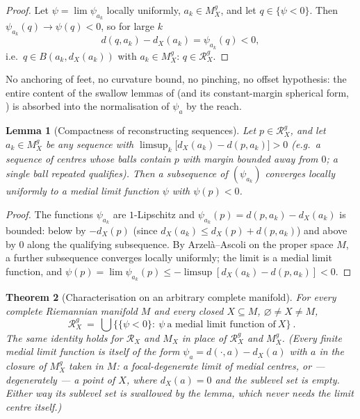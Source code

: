 \documentclass[11pt]{article}
\newtheorem{theorem}{Theorem}[section]
\newtheorem{lemma}[theorem]{Lemma}
\theoremstyle{remark}
\newcommand{\X}{X}
\newcommand{\Mx}{M_{\X}}
\newcommand{\Mg}{M^{g}_{\X}}
\newcommand{\Rx}{\mathcal{R}_{\X}}
\newcommand{\Rg}{\mathcal{R}^{g}_{\X}}
\newcommand{\dX}{d_{\X}}
\begin{document}
\begin{proof}
Let $\psi=\lim\psi_{a_{k}}$ locally uniformly, $a_{k}\in\Mg$, and let
$q\in\{\psi<0\}$. Then $\psi_{a_{k}}(q)\to\psi(q)<0$, so for large $k$
\[
  d(q,a_{k})-\dX(a_{k})=\psi_{a_{k}}(q)<0,
\]
i.e.\ $q\in B(a_{k},\dX(a_{k}))$ with $a_{k}\in\Mg$: $q\in\Rg$.
\end{proof}

No anchoring of feet, no curvature bound, no pinching, no offset
hypothesis: the entire content of the swallow lemmas of
\cite[Lem.~2.2]{R3} (and its constant-margin spherical form, \cite[Rem.~4.2]{Sph}) is absorbed into the
normalisation of $\psi_{a}$ by the reach.

\begin{lemma}[Compactness of reconstructing sequences]\label{lem:cpt}
Let $p\in\Rg$, and let $a_{k}\in\Mg$ be any sequence with
$\limsup_{k}\bigl[\dX(a_{k})-d(p,a_{k})\bigr]>0$ (e.g.\ a sequence of
centres whose balls contain $p$ with margin bounded away from $0$; a
single ball repeated qualifies). Then a subsequence of
$(\psi_{a_{k}})$ converges locally uniformly to a medial limit
function $\psi$ with $\psi(p)<0$.
\end{lemma}

\begin{proof}
The functions $\psi_{a_{k}}$ are $1$-Lipschitz and
$\psi_{a_{k}}(p)=d(p,a_{k})-\dX(a_{k})$ is bounded: below by
$-\dX(p)$ (since $\dX(a_{k})\le\dX(p)+d(p,a_{k})$) and above by $0$
along the qualifying subsequence. By Arzel\`a--Ascoli on the proper
space $M$, a further subsequence converges locally uniformly; the
limit is a medial limit function, and
$\psi(p)=\lim\psi_{a_{k}}(p)\le-\limsup[\dX(a_{k})-d(p,a_{k})]<0$.
\end{proof}

\begin{theorem}[Characterisation on an arbitrary complete manifold]
\label{thm:char}
For every complete Riemannian manifold $M$ and every closed
$\X\subseteq M$, $\varnothing\neq\X\neq M$,
\[
  \boxed{\ \Rg\ =\ \bigcup\bigl\{\{\psi<0\}:\ \psi\ \text{a medial
  limit function of}\ \X\bigr\}\ }.
\]
The same identity holds for $\Rx$ and $\Mx$ in place of $\Rg$ and
$\Mg$. (Every finite medial limit function is itself of the form
$\psi_{a}=d(\cdot,a)-\dX(a)$ with $a$ in the closure of $\Mg$ taken
in $M$: a focal-degenerate limit of medial centres, or ---
degenerately --- a point of $\X$, where $\dX(a)=0$ and the sublevel
set is empty. Either way its sublevel set is swallowed by the lemma,
which never needs the limit centre itself.)
\end{theorem}
\end{document}
